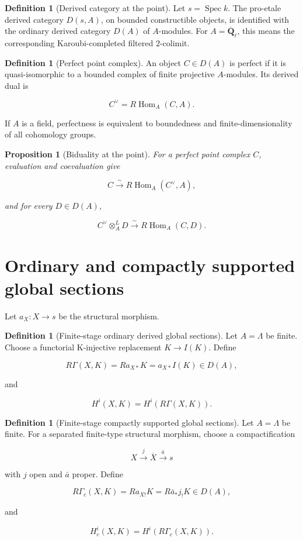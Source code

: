\documentclass[10pt]{article}
\newtheorem{proposition}[theorem]{Proposition}
\theoremstyle{definition}
\newtheorem{definition}[theorem]{Definition}
\newcommand{\Qlb}{\overline{\mathbf Q}_\ell}
\newcommand{\RG}{R\Gamma}
\newcommand{\RGc}{R\Gamma_c}
\begin{document}
\begin{definition}[Derived category at the point]
Let \(s=\operatorname{Spec}k\).  The pro-etale derived category
\(D(s,A)\), on bounded constructible objects, is identified with the
ordinary derived category \(D(A)\) of \(A\)-modules.  For \(A=\Qlb\), this
means the corresponding Karoubi-completed filtered \(2\)-colimit.
\end{definition}

\begin{definition}[Perfect point complex]
An object \(C\in D(A)\) is perfect if it is quasi-isomorphic to a bounded
complex of finite projective \(A\)-modules.  Its derived dual is

\[
 C^\vee=R\operatorname{Hom}_A(C,A).
\]

If \(A\) is a field, perfectness is equivalent to boundedness and
finite-dimensionality of all cohomology groups.
\end{definition}

\begin{proposition}[Biduality at the point]
For a perfect point complex \(C\), evaluation and coevaluation give

\[
 C\xrightarrow{\sim}R\operatorname{Hom}_A(C^\vee,A),
\]

and for every \(D\in D(A)\),

\[
 C^\vee\otimes_A^LD\xrightarrow{\sim}R\operatorname{Hom}_A(C,D).
\]
\end{proposition}

\section{Ordinary and compactly supported global sections}

Let \(a_X:X\to s\) be the structural morphism.

\begin{definition}[Finite-stage ordinary derived global sections]
Let \(A=\Lambda\) be finite.  Choose a functorial K-injective replacement
\(K\to I(K)\).  Define

\[
 \RG(X,K)=Ra_{X*}K=a_{X*}I(K)\in D(A),
\]

and

\[
 H^i(X,K)=H^i(\RG(X,K)).
\]
\end{definition}

\begin{definition}[Finite-stage compactly supported global sections]
Let \(A=\Lambda\) be finite.  For a separated finite-type structural
morphism, choose a compactification

\[
 X\xrightarrow j\overline X\xrightarrow{\bar a}s
\]

with \(j\) open and \(\bar a\) proper.  Define

\[
 \RGc(X,K)=Ra_{X!}K=R\bar a_*j_!K\in D(A),
\]

and

\[
 H_c^i(X,K)=H^i(\RGc(X,K)).
\]
\end{definition}
\end{document}
